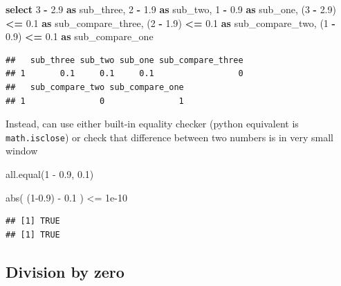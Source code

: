\documentclass[
]{krantz}
\makeatletter
\newenvironment{Shaded}{\begin{snugshade}}{\end{snugshade}}
\newcommand{\DecValTok}[1]{\textcolor[rgb]{0.06,0.06,0.06}{#1}}
\newcommand{\FloatTok}[1]{\textcolor[rgb]{0.06,0.06,0.06}{#1}}
\newcommand{\FunctionTok}[1]{\textcolor[rgb]{0,0,0}{#1}}
\newcommand{\KeywordTok}[1]{\textcolor[rgb]{0.27,0.27,0.27}{\textbf{#1}}}
\newcommand{\NormalTok}[1]{#1}
\newcommand{\OperatorTok}[1]{\textcolor[rgb]{0.43,0.43,0.43}{\textbf{#1}}}
\newcommand{\SpecialCharTok}[1]{\textcolor[rgb]{0,0,0}{#1}}
\newenvironment{kframe}{%
\medskip{}
\setlength{\fboxsep}{.8em}
 \def\at@end@of@kframe{}%
 \ifinner\ifhmode%
  \def\at@end@of@kframe{\end{minipage}}%
  \begin{minipage}{\columnwidth}%
 \fi\fi%
 \def\FrameCommand##1{\hskip\@totalleftmargin \hskip-\fboxsep
 \colorbox{shadecolor}{##1}\hskip-\fboxsep
     \hskip-\linewidth \hskip-\@totalleftmargin \hskip\columnwidth}%
 \MakeFramed {\advance\hsize-\width
   \@totalleftmargin\z@ \linewidth\hsize
   \@setminipage}}%
 {\par\unskip\endMakeFramed%
 \at@end@of@kframe}
\renewenvironment{Shaded}{\begin{kframe}}{\end{kframe}}
\makeatother
\begin{document}
\begin{Shaded}
\begin{Highlighting}[]
\KeywordTok{select}
  \DecValTok{3} \OperatorTok{{-}} \FloatTok{2.9} \KeywordTok{as}\NormalTok{ sub\_three,}
  \DecValTok{2} \OperatorTok{{-}} \FloatTok{1.9} \KeywordTok{as}\NormalTok{ sub\_two,}
  \DecValTok{1} \OperatorTok{{-}} \FloatTok{0.9} \KeywordTok{as}\NormalTok{ sub\_one,}
\NormalTok{  (}\DecValTok{3} \OperatorTok{{-}} \FloatTok{2.9}\NormalTok{) }\OperatorTok{\textless{}=} \FloatTok{0.1} \KeywordTok{as}\NormalTok{ sub\_compare\_three,}
\NormalTok{  (}\DecValTok{2} \OperatorTok{{-}} \FloatTok{1.9}\NormalTok{) }\OperatorTok{\textless{}=} \FloatTok{0.1} \KeywordTok{as}\NormalTok{ sub\_compare\_two,}
\NormalTok{  (}\DecValTok{1} \OperatorTok{{-}} \FloatTok{0.9}\NormalTok{) }\OperatorTok{\textless{}=} \FloatTok{0.1} \KeywordTok{as}\NormalTok{ sub\_compare\_one}
\end{Highlighting}
\end{Shaded}

\begin{verbatim}
##   sub_three sub_two sub_one sub_compare_three
## 1       0.1     0.1     0.1                 0
##   sub_compare_two sub_compare_one
## 1               0               1
\end{verbatim}

Instead, can use either built-in equality checker (python equivalent is \texttt{math.isclose}) or check that difference between two numbers is in very small window

\begin{Shaded}
\begin{Highlighting}[]
\FunctionTok{all.equal}\NormalTok{(}\DecValTok{1} \SpecialCharTok{{-}} \FloatTok{0.9}\NormalTok{, }\FloatTok{0.1}\NormalTok{)}

\FunctionTok{abs}\NormalTok{( (}\DecValTok{1}\FloatTok{{-}0.9}\NormalTok{) }\SpecialCharTok{{-}} \FloatTok{0.1}\NormalTok{ ) }\SpecialCharTok{\textless{}=} \FloatTok{1e{-}10}
\end{Highlighting}
\end{Shaded}

\begin{verbatim}
## [1] TRUE
## [1] TRUE
\end{verbatim}

\hypertarget{division-by-zero}{%
\subsection{Division by zero}\label{division-by-zero}}
\end{document}
